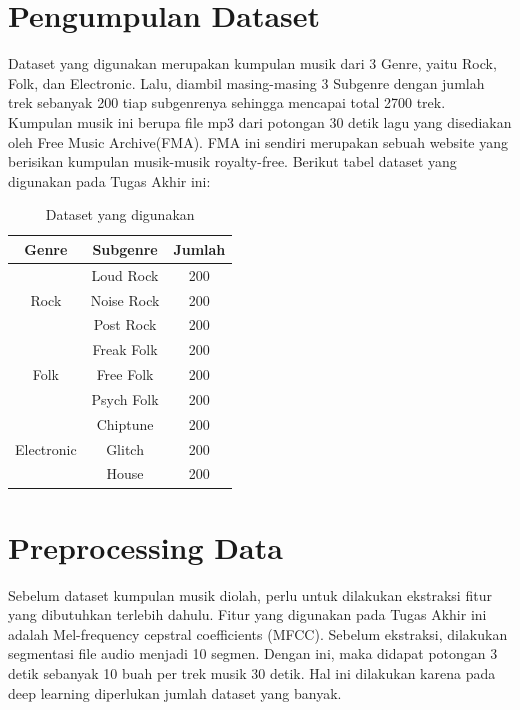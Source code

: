 \section{Pengumpulan Dataset}
\label{sec:pengumpulan dataset}

Dataset yang digunakan merupakan kumpulan musik dari 3 Genre, yaitu Rock, Folk, dan Electronic. Lalu, diambil masing-masing 3 Subgenre dengan jumlah trek sebanyak 200 tiap subgenrenya sehingga mencapai total 2700 trek. Kumpulan musik ini berupa file mp3 dari potongan 30 detik lagu yang disediakan oleh Free Music Archive(FMA). FMA ini sendiri merupakan sebuah website yang berisikan kumpulan musik-musik royalty-free. Berikut tabel dataset yang digunakan pada Tugas Akhir ini:

\begin{table}[h]
	\centering
	
	\caption{Dataset yang digunakan}
	
	\begin{tabular}{|c|c|c|}
		\hline
		\textbf{Genre}              & \textbf{Subgenre} & \textbf{Jumlah} \\ \hline
		\multirow{3}{*}{Rock}       & Loud Rock         & 200             \\ \cline{2-3} 
		& Noise Rock        & 200             \\ \cline{2-3} 
		& Post Rock         & 200             \\ \hline
		\multirow{3}{*}{Folk}       & Freak Folk        & 200             \\ \cline{2-3} 
		& Free Folk         & 200             \\ \cline{2-3} 
		& Psych Folk        & 200             \\ \hline
		\multirow{3}{*}{Electronic} & Chiptune          & 200             \\ \cline{2-3} 
		& Glitch            & 200             \\ \cline{2-3} 
		& House             & 200             \\ \hline
	\end{tabular}
	
	\label{fig:dataset}
\end{table}

\section{Preprocessing Data}
\label{sec:preprocessing}

Sebelum dataset kumpulan musik diolah, perlu untuk dilakukan ekstraksi fitur yang dibutuhkan terlebih dahulu. Fitur yang digunakan pada Tugas Akhir ini adalah Mel-frequency cepstral coefficients (MFCC). Sebelum ekstraksi, dilakukan segmentasi file audio menjadi 10 segmen. Dengan ini, maka didapat potongan 3 detik sebanyak 10 buah per trek musik 30 detik. Hal ini dilakukan karena pada deep learning diperlukan jumlah dataset yang banyak. 

